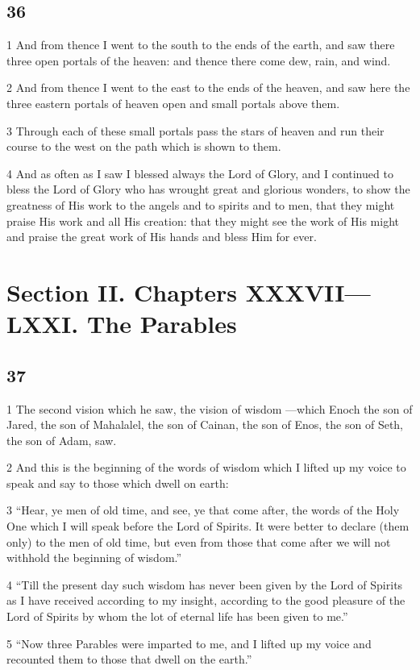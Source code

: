 \chapter{36}

\par 1 And from thence I went to the south to the ends of the earth, and saw there three open portals of the heaven: and thence there come dew, rain, and wind.
\par 2 And from thence I went to the east to the ends of the heaven, and saw here the three eastern portals of heaven open and small portals above them.
\par 3 Through each of these small portals pass the stars of heaven and run their course to the west on the path which is shown to them.
\par 4 And as often as I saw I blessed always the Lord of Glory, and I continued to bless the Lord of Glory who has wrought great and glorious wonders, to show the greatness of His work to the angels and to spirits and to men, that they might praise His work and all His creation: that they might see the work of His might and praise the great work of His hands and bless Him for ever.

\part{Section II. Chapters XXXVII—LXXI. The Parables}

\chapter{37}

\par 1 The second vision which he saw, the vision of wisdom —which Enoch the son of Jared, the son of Mahalalel, the son of Cainan, the son of Enos, the son of Seth, the son of Adam, saw.
\par 2 And this is the beginning of the words of wisdom which I lifted up my voice to speak and say to those which dwell on earth:
\par 3 “Hear, ye men of old time, and see, ye that come after, the words of the Holy One which I will speak before the Lord of Spirits. It were better to declare (them only) to the men of old time, but even from those that come after we will not withhold the beginning of wisdom.”
\par 4 “Till the present day such wisdom has never been given by the Lord of Spirits as I have received according to my insight, according to the good pleasure of the Lord of Spirits by whom the lot of eternal life has been given to me.”
\par 5 “Now three Parables were imparted to me, and I lifted up my voice and recounted them to those that dwell on the earth.”

